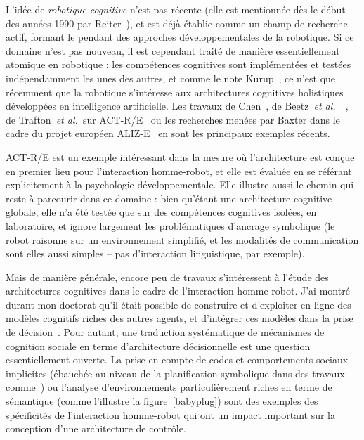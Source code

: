 \documentclass[a4paper]{article}
\newcommand{\etal}{{\textit{et al.~}}}
\begin{document}
L'idée de \emph{robotique cognitive} n'est pas récente (elle est mentionnée dès
le début des années 1990 par Reiter~\cite{Levesque2008}), et est déjà établie
comme un champ de recherche actif, formant le pendant des approches
développementales de la robotique. Si ce domaine n'est pas nouveau, il est cependant
traité de manière essentiellement atomique en robotique : les compétences
cognitives sont implémentées et testées indépendamment les unes des autres, et
comme le note Kurup~\cite{kurup2012what}, ce n'est que récemment que la
robotique s'intéresse aux architectures cognitives holistiques développées en
intelligence artificielle. Les travaux de Chen~\cite{Chen2010}, de
Beetz~\etal~\cite{Beetz2010}, de Trafton~\etal sur ACT-R/E~\cite{trafton2013act}
ou les recherches menées par Baxter dans le cadre du projet européen
ALIZ-E~\cite{baxter2013cognitive} en sont les principaux exemples récents.

ACT-R/E est un exemple intéressant dans la mesure où l'architecture est conçue
en premier lieu pour l'interaction homme-robot, et elle est évaluée en se
référant explicitement à la psychologie développementale. Elle illustre aussi le
chemin qui reste à parcourir dans ce domaine : bien qu'étant une architecture
cognitive globale, elle n'a été testée que sur des compétences cognitives
isolées, en laboratoire, et ignore largement les problématiques d'ancrage
symbolique (le robot raisonne sur un environnement simplifié, et les modalités
de communication sont elles aussi simples -- pas d'interaction linguistique, par
exemple).

Mais de manière générale, encore peu de travaux s'intéressent à l'étude des
architectures cognitives dans le cadre de l'interaction homme-robot. J'ai montré
durant mon doctorat qu'il était possible de construire et d'exploiter en ligne
des modèles cognitifs riches des autres agents, et d'intégrer ces modèles dans
la prise de décision~\cite{alami2011when, warnier2012when, lemaignan2014human}.
Pour autant, une traduction systématique de mécanismes de cognition sociale en
terme d'architecture décisionnelle est une question essentiellement ouverte. La
prise en compte de codes et comportements sociaux implicites (ébauchée au niveau
de la planification symbolique dans des travaux comme~\cite{Alili2009}) ou
l'analyse d'environnements particulièrement riches en terme de sémantique (comme
l'illustre la figure~\ref{babyplug}) sont des exemples des spécificités de
l'interaction homme-robot qui ont un impact important sur la conception d'une
architecture de contrôle.
\end{document}
